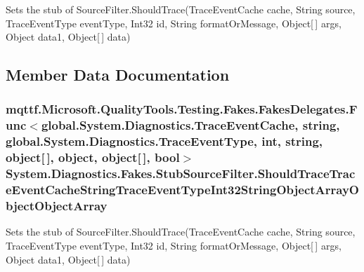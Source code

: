 Sets the stub of Source\-Filter.\-Should\-Trace(\-Trace\-Event\-Cache cache, String source, Trace\-Event\-Type event\-Type, Int32 id, String format\-Or\-Message, Object\mbox{[}$\,$\mbox{]} args, Object data1, Object\mbox{[}$\,$\mbox{]} data)



\subsection{Member Data Documentation}
\hypertarget{class_system_1_1_diagnostics_1_1_fakes_1_1_stub_source_filter_ad6cf832013d35306d1e418c8d876460d}{
\subsubsection[{Should\-Trace\-Trace\-Event\-Cache\-String\-Trace\-Event\-Type\-Int32\-String\-Object\-Array\-Object\-Object\-Array}]{\setlength{\rightskip}{0pt plus 5cm}mqttf.\-Microsoft.\-Quality\-Tools.\-Testing.\-Fakes.\-Fakes\-Delegates.\-Func$<$global.\-System.\-Diagnostics.\-Trace\-Event\-Cache, string, global.\-System.\-Diagnostics.\-Trace\-Event\-Type, int, string, object\mbox{[}$\,$\mbox{]}, object, object\mbox{[}$\,$\mbox{]}, bool$>$ System.\-Diagnostics.\-Fakes.\-Stub\-Source\-Filter.\-Should\-Trace\-Trace\-Event\-Cache\-String\-Trace\-Event\-Type\-Int32\-String\-Object\-Array\-Object\-Object\-Array}}\label{class_system_1_1_diagnostics_1_1_fakes_1_1_stub_source_filter_ad6cf832013d35306d1e418c8d876460d}


Sets the stub of Source\-Filter.\-Should\-Trace(\-Trace\-Event\-Cache cache, String source, Trace\-Event\-Type event\-Type, Int32 id, String format\-Or\-Message, Object\mbox{[}$\,$\mbox{]} args, Object data1, Object\mbox{[}$\,$\mbox{]} data)



